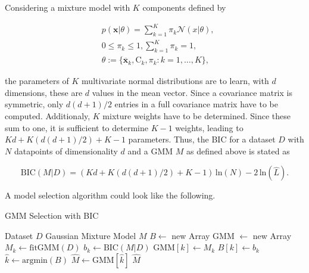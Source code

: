 \documentclass[../../../main.tex]{subfiles}
\begin{document}
Considering a mixture model with $K$ components defined by 

\begin{equation}
    \begin{aligned}
        &p(\bm{x}|\theta) = \sum\limits_{k=1}^K \pi_k \mathcal{N}(x | \theta), \\
        &0 \leq \pi_k \leq 1, \sum\limits_{k=1}^K \pi_k = 1, \\
        &\theta := \{\overline{\bm{x}}_k, \bm{\mathrm{C}}_k, \pi_k : k = 1, \dots, K \},
    \end{aligned}
\end{equation}

the parameters of $K$ multivariate normal distributions are to learn, with $d$ dimensions, these are $d$ values in the mean vector.  Since a covariance matrix is symmetric, only $d(d+1)/2$ entries in a full covariance matrix have to be computed. Additionaly, $K$ mixture weights have to be determined. Since these sum to one, it is sufficient to determine $K-1$ weights, leading to $Kd + K(d(d+1)/2)+K-1$ parameters. Thus, the BIC for a dataset $D$ with $N$ datapoints of dimensionality $d$ and a GMM $M$ as defined above is stated as 

\begin{equation}
    \text{BIC}(M|D) = (Kd + K(d(d+1)/2)+K-1) \, \text{ln}(N) - 2 \, \text{ln}(\hat{L}).
\end{equation}

A model selection algorithm could look like the following.

\begin{algorithm}
    \caption{GMM Selection with BIC}
    \label{alg:gmm_selection_bic}
 
    \begin{algorithmic}[1]
        \REQUIRE Dataset $D$
        \ENSURE Gaussian Mixture Model $M$
        \STATE $B \leftarrow$ new Array
        \STATE GMM $\leftarrow$ new Array
            \STATE $M_k \leftarrow \text{fitGMM}(D)$
            \STATE $b_k \leftarrow \text{BIC}(M|D)$
            \STATE GMM$[k] \leftarrow M_k$
            \STATE $B[k] \leftarrow b_k$
        \ENDFOR
        \STATE $\hat{k} \leftarrow \text{argmin}(B)$
        \STATE $\hat{M} \leftarrow \text{GMM}[\hat{k}]$
        \RETURN $\hat{M}$

        
    \end{algorithmic}
 \end{algorithm}
\end{document}
